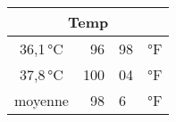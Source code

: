 \begin{tabular}{|c|r@{,}lc|}
    \hline
    \multicolumn{4}{|c|}{Temp}\\
    \hline\hline
    36,1 °C & 96 & 98 & °F\\
    37,8 °C & 100 & 04 & °F\\
    \hline
    \multicolumn{1}{c|}{moyenne}
    & 98 & 6 & °F\\
    \cline{2-4}
\end{tabular}
